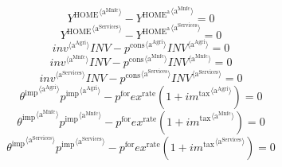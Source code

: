 \begin{equation}
{Y^{\mathrm{HOME}}}^{\langle \mathrm{a}^{\mathrm{Mnfc}}\rangle} - {Y^{\mathrm{HOME}^{\mathrm{a}}}}^{\langle \mathrm{a}^{\mathrm{Mnfc}}\rangle} = 0
\end{equation}
\begin{equation}
{Y^{\mathrm{HOME}}}^{\langle \mathrm{a}^{\mathrm{Services}}\rangle} - {Y^{\mathrm{HOME}^{\mathrm{a}}}}^{\langle \mathrm{a}^{\mathrm{Services}}\rangle} = 0
\end{equation}
\begin{equation}
{{{i\!n\!v}}^{\langle \mathrm{\mathrm{a}^{\mathrm{Agri}}}\rangle}} {{I\!N\!V}} - {{p^{\mathrm{cons}}}^{\langle \mathrm{a}^{\mathrm{Agri}}\rangle}} {{{I\!N\!V}}^{\langle \mathrm{a}^{\mathrm{Agri}}\rangle}} = 0
\end{equation}
\begin{equation}
{{{i\!n\!v}}^{\langle \mathrm{\mathrm{a}^{\mathrm{Mnfc}}}\rangle}} {{I\!N\!V}} - {{p^{\mathrm{cons}}}^{\langle \mathrm{a}^{\mathrm{Mnfc}}\rangle}} {{{I\!N\!V}}^{\langle \mathrm{a}^{\mathrm{Mnfc}}\rangle}} = 0
\end{equation}
\begin{equation}
{{{i\!n\!v}}^{\langle \mathrm{\mathrm{a}^{\mathrm{Services}}}\rangle}} {{I\!N\!V}} - {{p^{\mathrm{cons}}}^{\langle \mathrm{a}^{\mathrm{Services}}\rangle}} {{{I\!N\!V}}^{\langle \mathrm{a}^{\mathrm{Services}}\rangle}} = 0
\end{equation}
\begin{equation}
{{\theta^{\mathrm{imp}}}^{\langle \mathrm{\mathrm{a}^{\mathrm{Agri}}}\rangle}} {{p^{\mathrm{imp}}}^{\langle \mathrm{a}^{\mathrm{Agri}}\rangle}} - {p^{\mathrm{for}}} {{e\!x}^{\mathrm{rate}}} \left(1 + {{i\!m}^{\mathrm{tax}}}^{\langle \mathrm{\mathrm{a}^{\mathrm{Agri}}}\rangle}\right) = 0
\end{equation}
\begin{equation}
{{\theta^{\mathrm{imp}}}^{\langle \mathrm{\mathrm{a}^{\mathrm{Mnfc}}}\rangle}} {{p^{\mathrm{imp}}}^{\langle \mathrm{a}^{\mathrm{Mnfc}}\rangle}} - {p^{\mathrm{for}}} {{e\!x}^{\mathrm{rate}}} \left(1 + {{i\!m}^{\mathrm{tax}}}^{\langle \mathrm{\mathrm{a}^{\mathrm{Mnfc}}}\rangle}\right) = 0
\end{equation}
\begin{equation}
{{\theta^{\mathrm{imp}}}^{\langle \mathrm{\mathrm{a}^{\mathrm{Services}}}\rangle}} {{p^{\mathrm{imp}}}^{\langle \mathrm{a}^{\mathrm{Services}}\rangle}} - {p^{\mathrm{for}}} {{e\!x}^{\mathrm{rate}}} \left(1 + {{i\!m}^{\mathrm{tax}}}^{\langle \mathrm{\mathrm{a}^{\mathrm{Services}}}\rangle}\right) = 0
\end{equation}
